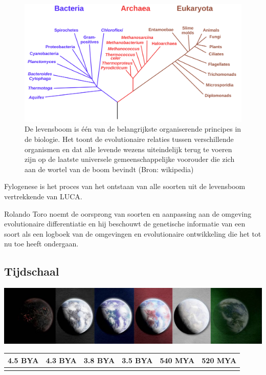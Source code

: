 \documentclass[
  11pt,
]{book}
\begin{document}
\begin{figure}

{\centering \includegraphics[width=1\linewidth]{./figs/Phylogenetic_tree} 

}

\caption{De levensboom is één van de belangrijkste organiserende principes in de biologie. Het toont de evolutionaire relaties tussen verschillende organismen en dat alle levende wezens uiteindelijk terug te voeren zijn op de laatste universele gemeenschappelijke voorouder die zich aan de wortel van de boom bevindt (Bron: wikipedia)}\label{fig:treeOfLifeBis}
\end{figure}

Fylogenese is het proces van het ontstaan van alle soorten uit de levensboom vertrekkende van LUCA.

Rolando Toro noemt de oorsprong van soorten en aanpassing aan de omgeving evolutionaire differentiatie en hij beschouwt de genetische informatie van een soort als een logboek van de omgevingen en evolutionaire ontwikkeling die het tot nu toe heeft ondergaan.

\hypertarget{tijdschaal}{%
\subsection{Tijdschaal}\label{tijdschaal}}

\includegraphics{./figs/liferockystartstrip.jpeg}

\begin{longtable}[]{@{}llllll@{}}
\toprule()
4.5 BYA & 4.3 BYA & 3.8 BYA & 3.5 BYA & 540 MYA & 520 MYA \\
\midrule()
\endhead
& & & & & \\
\bottomrule()
\end{longtable}
\end{document}
